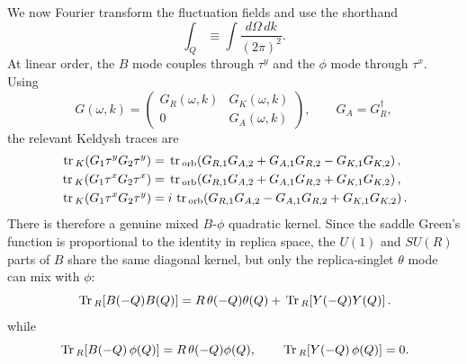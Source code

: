 \documentclass[aps,prx,preprint,amsmath,amssymb]{revtex4-2}
\newcommand{\Tr}{{\rm \, Tr\,}}
\newcommand{\tr}{{\rm \, tr\,}}
\begin{document}
We now Fourier transform the fluctuation fields and use the shorthand
\begin{equation}\label{eq:Q-int-short}
\int_Q \equiv \int \frac{d\Omega\,dk}{(2\pi)^2}.
\end{equation}
At linear order, the \(B\) mode couples through \(\tau^y\) and the \(\phi\) mode
through \(\tau^x\).  Using
\begin{equation}\label{eq:G-keldysh-triangular}
G(\omega,k)=
\begin{pmatrix}
G_R(\omega,k) & G_K(\omega,k)\\
0 & G_A(\omega,k)
\end{pmatrix},
\qquad
G_A=G_R^\dagger,
\end{equation}
the relevant Keldysh traces are
\begin{align}
\tr_K\!\left(G_1\tau^y G_2\tau^y\right)
&=
\tr_{\rm orb}\!\left(
G_{R,1}G_{A,2}+G_{A,1}G_{R,2}-G_{K,1}G_{K,2}
\right),
\label{eq:tauy-bubble}
\\
\tr_K\!\left(G_1\tau^x G_2\tau^x\right)
&=
\tr_{\rm orb}\!\left(
G_{R,1}G_{A,2}+G_{A,1}G_{R,2}+G_{K,1}G_{K,2}
\right),
\label{eq:taux-bubble}
\\
\tr_K\!\left(G_1\tau^x G_2\tau^y\right)
&=
i\,\tr_{\rm orb}\!\left(
G_{R,1}G_{A,2}-G_{A,1}G_{R,2}+G_{K,1}G_{K,2}
\right).
\label{eq:taux-tauy-mixing}
\end{align}
There is therefore a genuine mixed \(B\)-\(\phi\) quadratic kernel. Since the
saddle Green's function is proportional to the identity in replica space, the
\(U(1)\) and \(SU(R)\) parts of \(B\) share the same diagonal kernel, but only
the replica-singlet \(\theta\) mode can mix with \(\phi\):
\begin{equation}\label{eq:B-trace-split}
\Tr_R\!\left[B(-Q)B(Q)\right]
=
R\,\theta(-Q)\theta(Q)+\Tr_R\!\left[Y(-Q)Y(Q)\right].
\end{equation}
while
\begin{equation}\label{eq:B-phi-trace}
\Tr_R\!\left[B(-Q)\,\phi(Q)\right]=R\,\theta(-Q)\phi(Q),
\qquad
\Tr_R\!\left[Y(-Q)\,\phi(Q)\right]=0.
\end{equation}
\end{document}
